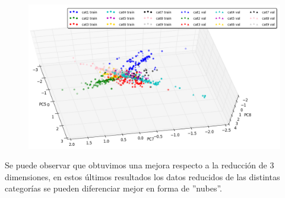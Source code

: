 \begin{figure}[ht!]
	\centering
	\includegraphics[width=0.85\linewidth]{img/parte1-vista3d-sanger-9dim3.png}

\end{figure}

Se puede observar que obtuvimos una mejora respecto a la reducción de 3 dimensiones, en estos últimos resultados los datos reducidos de las distintas categorías se pueden diferenciar mejor en forma de ''nubes''.